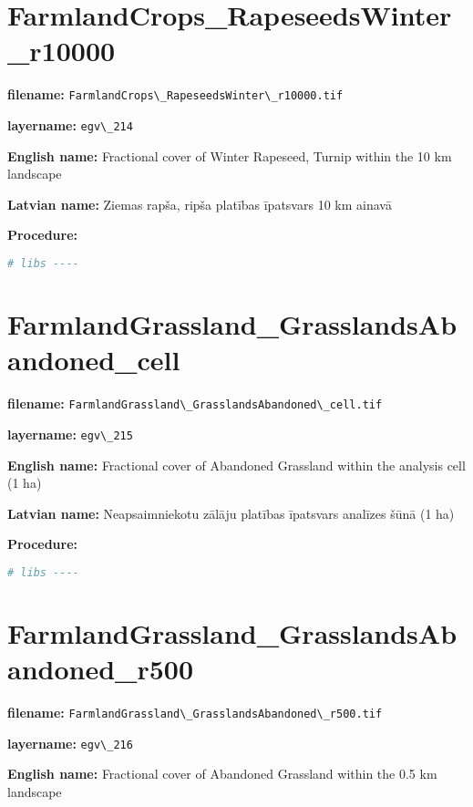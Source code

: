\documentclass[
]{book}
\newcommand{\passthrough}[1]{#1}
\begin{document}
\section{FarmlandCrops\_RapeseedsWinter\_r10000}\label{ch06.214}

\textbf{filename:} \passthrough{\lstinline!FarmlandCrops\_RapeseedsWinter\_r10000.tif!}

\textbf{layername:} \passthrough{\lstinline!egv\_214!}

\textbf{English name:} Fractional cover of Winter Rapeseed, Turnip within the 10 km landscape

\textbf{Latvian name:} Ziemas rapša, ripša platības īpatsvars 10 km ainavā

\textbf{Procedure:}

\begin{lstlisting}[language=R]
# libs ----
\end{lstlisting}

\section{FarmlandGrassland\_GrasslandsAbandoned\_cell}\label{ch06.215}

\textbf{filename:} \passthrough{\lstinline!FarmlandGrassland\_GrasslandsAbandoned\_cell.tif!}

\textbf{layername:} \passthrough{\lstinline!egv\_215!}

\textbf{English name:} Fractional cover of Abandoned Grassland within the analysis cell (1 ha)

\textbf{Latvian name:} Neapsaimniekotu zālāju platības īpatsvars analīzes šūnā (1 ha)

\textbf{Procedure:}

\begin{lstlisting}[language=R]
# libs ----
\end{lstlisting}

\section{FarmlandGrassland\_GrasslandsAbandoned\_r500}\label{ch06.216}

\textbf{filename:} \passthrough{\lstinline!FarmlandGrassland\_GrasslandsAbandoned\_r500.tif!}

\textbf{layername:} \passthrough{\lstinline!egv\_216!}

\textbf{English name:} Fractional cover of Abandoned Grassland within the 0.5 km landscape
\end{document}
